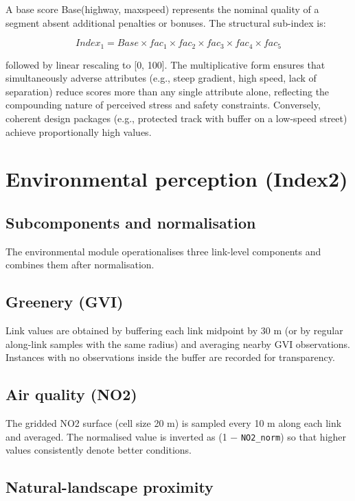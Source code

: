 \documentclass[
  12pt,
  oneside]{book}
\begin{document}
A base score Base(highway, maxspeed) represents the nominal quality of a segment absent additional penalties or bonuses. The structural sub-index is:

\[Index_{1} = Base \times fac_{1} \times fac_{2} \times fac_{3} \times fac_{4} \times fac_{5}\]

followed by linear rescaling to {[}0, 100{]}. The multiplicative form ensures that simultaneously adverse attributes (e.g., steep gradient, high speed, lack of separation) reduce scores more than any single attribute alone, reflecting the compounding nature of perceived stress and safety constraints. Conversely, coherent design packages (e.g., protected track with buffer on a low-speed street) achieve proportionally high values.

\section{Environmental perception (Index2)}\label{environmental-perception-index2}

\subsection{Subcomponents and normalisation}\label{subcomponents-and-normalisation}

The environmental module operationalises three link-level components and combines them after normalisation.

\subsection{Greenery (GVI)}\label{greenery-gvi}

Link values are obtained by buffering each link midpoint by 30 m (or by regular along-link samples with the same radius) and averaging nearby GVI observations. Instances with no observations inside the buffer are recorded for transparency.

\subsection{Air quality (NO2)}\label{air-quality-no2}

The gridded NO2 surface (cell size 20 m) is sampled every 10 m along each link and averaged. The normalised value is inverted as (1 − \texttt{NO2\_norm}) so that higher values consistently denote better conditions.

\subsection{Natural-landscape proximity}\label{natural-landscape-proximity}
\end{document}
